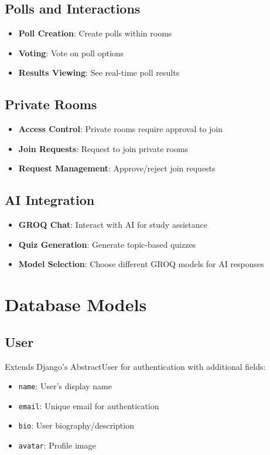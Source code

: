 \documentclass[11pt]{article}
\begin{document}
\subsection{Polls and Interactions}
\begin{itemize}
  \item \textbf{Poll Creation}: Create polls within rooms
  \item \textbf{Voting}: Vote on poll options
  \item \textbf{Results Viewing}: See real-time poll results
\end{itemize}

\subsection{Private Rooms}
\begin{itemize}
  \item \textbf{Access Control}: Private rooms require approval to join
  \item \textbf{Join Requests}: Request to join private rooms
  \item \textbf{Request Management}: Approve/reject join requests
\end{itemize}

\subsection{AI Integration}
\begin{itemize}
  \item \textbf{GROQ Chat}: Interact with AI for study assistance
  \item \textbf{Quiz Generation}: Generate topic-based quizzes
  \item \textbf{Model Selection}: Choose different GROQ models for AI responses
\end{itemize}

\section{Database Models}

\subsection{User}
Extends Django's AbstractUser for authentication with additional fields:
\begin{itemize}
  \item \texttt{name}: User's display name
  \item \texttt{email}: Unique email for authentication
  \item \texttt{bio}: User biography/description
  \item \texttt{avatar}: Profile image
\end{itemize}
\end{document}
